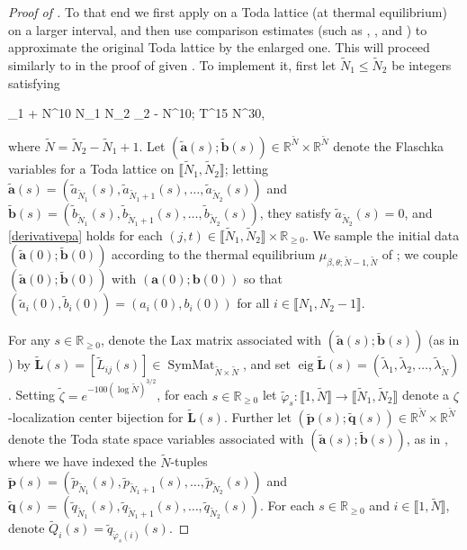\documentclass{amsart}
\numberwithin{equation}{section}
\DeclareMathOperator{\eig}{eig}
\DeclareMathOperator{\SymMat}{SymMat}
\theoremstyle{remark}
\theoremstyle{definition}
\begin{document}
\begin{proof}[Proof of ]
		To that end we first apply  on a Toda lattice (at thermal equilibrium) on a larger interval, and then use comparison estimates (such as , , and ) to approximate the original Toda lattice by the enlarged one. This will proceed similarly to in the proof of \cite[Theorem 8.5]{LC} given \cite[Theorem 8.2]{LC}. To implement it, first let $\tilde{N}_1 \le \tilde{N}_2$ be integers satisfying 
		\begin{flalign}
			\label{nn} 
			_1 + N^{10} \le N_1 \le N_2 \le {}_2 - N^{10}; \qquad  T^{15} \le {} \le N^{30},
		\end{flalign} 
		
		\noindent where $\tilde{N} = \tilde{N}_2 - \tilde{N}_1 + 1$. Let $(\tilde{\bm{a}} (s); \tilde{\bm{b}} (s)) \in \mathbb{R}^{\tilde{N}} \times \mathbb{R}^{\tilde{N}}$ denote the Flaschka variables for a Toda lattice on $\llbracket \tilde{N}_1, \tilde{N}_2 \rrbracket$; letting $\tilde{\bm{a}} (s) = (\tilde{a}_{\tilde{N}_1} (s), \tilde{a}_{\tilde{N}_1+1} (s), \ldots , \tilde{a}_{\tilde{N}_2} (s))$ and $\tilde{\bm{b}} (s) = (\tilde{b}_{\tilde{N}_1} (s), \tilde{b}_{\tilde{N}_1+1} (s), \ldots , \tilde{b}_{\tilde{N}_2}(s))$, they satisfy $\tilde{a}_{\tilde{N}_2} (s) = 0$, and \eqref{derivativepa} holds for each $(j, t) \in \llbracket \tilde{N}_1, \tilde{N}_2 \rrbracket \times \mathbb{R}_{\ge 0}$. We sample the initial data $(\tilde{\bm{a}}(0);\tilde{\bm{b}}(0))$ according to the thermal equilibrium $\mu_{\beta,\theta;\tilde{N}-1,\tilde{N}}$ of ; we couple $(\tilde{\bm{a}}(0);\tilde{\bm{b}}(0))$ with $(\bm{a}(0);\bm{b}(0))$ so that $(\tilde{a}_i(0),\tilde{b}_i(0)) = (a_i(0), b_i(0))$ for all $i \in \llbracket N_1, N_2 - 1 \rrbracket$. 
		
		For any $s \in \mathbb{R}_{\ge 0}$, denote the Lax matrix associated with $(\tilde{\bm{a}}(s);\tilde{\bm{b}}(s))$ (as in ) by $\tilde{\bm{L}}(s) = [\tilde{L}_{ij}(s)] \in \SymMat_{\tilde{N}\times\tilde{N}}$, and set $\eig \tilde{\bm{L}}(s) = (\tilde{\lambda}_1, \tilde{\lambda}_2, \ldots , \tilde{\lambda}_{\tilde{N}})$. Setting $\tilde{\zeta} = e^{-100 (\log \tilde{N})^{3/2}}$, for each $s \in \mathbb{R}_{\ge 0}$ let $\tilde{\varphi}_s : \llbracket 1, \tilde{N} \rrbracket \rightarrow \llbracket \tilde{N}_1, \tilde{N}_2 \rrbracket$ denote a $\zeta$-localization center bijection for $\tilde{\bm{L}}(s)$. Further let $(\tilde{\bm{p}} (s); \tilde{\bm{q}}(s)) \in \mathbb{R}^{\tilde{N}} \times \mathbb{R}^{\tilde{N}}$ denote the Toda state space variables associated with $(\tilde{\bm{a}}(s); \tilde{\bm{b}}(s))$, as in , where we have indexed the $\tilde{N}$-tuples $\tilde{\bm{p}} (s) = (\tilde{p}_{\tilde{N}_1} (s), \tilde{p}_{\tilde{N}_1+1} (s), \ldots , \tilde{p}_{\tilde{N}_2} (s))$ and $\tilde{\bm{q}} (s) = (\tilde{q}_{\tilde{N}_1} (s), \tilde{q}_{\tilde{N}_1+1} (s), \ldots , \tilde{q}_{\tilde{N}_2} (s))$. For each $s \in \mathbb{R}_{\ge 0}$ and $i \in \llbracket 1, \tilde{N} \rrbracket$, denote $\tilde{Q}_i (s) = \tilde{q}_{\tilde{\varphi}_s (i)} (s)$.
		

\end{proof}
\end{document}

